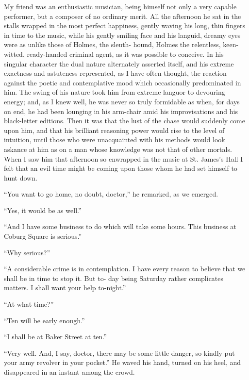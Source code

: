 My friend was an enthusiastic musician, being himself not
only a very capable performer, but a composer of no ordinary
merit. All the afternoon he sat in the stalls wrapped in the
most perfect happiness, gently waving his long, thin fingers
in time to the music, while his gently smiling face and his languid,
dreamy eyes were as unlike those of Holmes, the sleuth-%
hound, Holmes the relentless, keen-witted, ready-handed criminal
agent, as it was possible to conceive. In his singular
character the dual nature alternately asserted itself, and his
extreme exactness and astuteness represented, as I have often
thought, the reaction against the poetic and contemplative
mood which occasionally predominated in him. The swing
of his nature took him from extreme languor to devouring
energy; and, as I knew well, he was never so truly formidable
as when, for days on end, he had been lounging in his
arm-chair amid his improvisations and his black-letter editions.
Then it was that the lust of the chase would suddenly
come upon him, and that his brilliant reasoning power would
rise to the level of intuition, until those who were unacquainted
with his methods would look askance at him as on a man
whose knowledge was not that of other mortals. When I
saw him that afternoon so enwrapped in the music at St.
James’s Hall I felt that an evil time might be coming upon
those whom he had set himself to hunt down.

“You want to go home, no doubt, doctor,” he remarked,
as we emerged.

“Yes, it would be as well.”

“And I have some business to do which will take some
hours. This business at Coburg Square is serious.”

“Why serious?”

“A considerable crime is in contemplation. I have every
reason to believe that we shall be in time to stop it. But to-%
day being Saturday rather complicates matters. I shall want
your help to-night.”

“At what time?”

“Ten will be early enough.”

“I shall be at Baker Street at ten.”

“Very well. And, I say, doctor, there may be some little
danger, so kindly put your army revolver in your pocket.”
He waved his hand, turned on his heel, and disappeared in
an instant among the crowd.

